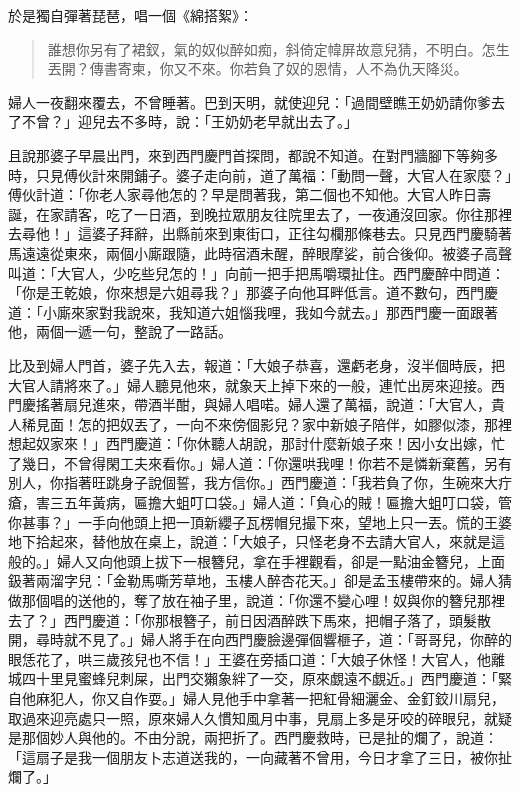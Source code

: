 於是獨自彈著琵琶，唱一個《綿搭絮》：
\begin{quote}
誰想你另有了裙釵，氣的奴似醉如痴，斜倚定幃屏故意兒猜，不明白。怎生丟開？傳書寄柬，你又不來。你若負了奴的恩情，人不為仇天降災。
\end{quote}

婦人一夜翻來覆去，不曾睡著。巴到天明，就使迎兒：「過間壁瞧王奶奶請你爹去了不曾？」迎兒去不多時，說：「王奶奶老早就出去了。」

且說那婆子早晨出門，來到西門慶門首探問，都說不知道。在對門牆腳下等夠多時，只見傅伙計來開鋪子。婆子走向前，道了萬福：「動問一聲，大官人在家麼？」傅伙計道：「你老人家尋他怎的？早是問著我，第二個也不知他。大官人昨日壽誕，在家請客，吃了一日酒，到晚拉眾朋友往院里去了，一夜通沒回家。你往那裡去尋他！」這婆子拜辭，出縣前來到東街口，正往勾欄那條巷去。只見西門慶騎著馬遠遠從東來，兩個小廝跟隨，此時宿酒未醒，醉眼摩娑，前合後仰。被婆子高聲叫道：「大官人，少吃些兒怎的！」向前一把手把馬嚼環扯住。西門慶醉中問道：「你是王乾娘，你來想是六姐尋我？」那婆子向他耳畔低言。道不數句，西門慶道：「小廝來家對我說來，我知道六姐惱我哩，我如今就去。」那西門慶一面跟著他，兩個一遞一句，整說了一路話。

比及到婦人門首，婆子先入去，報道：「大娘子恭喜，還虧老身，沒半個時辰，把大官人請將來了。」婦人聽見他來，就象天上掉下來的一般，連忙出房來迎接。西門慶搖著扇兒進來，帶酒半酣，與婦人唱喏。婦人還了萬福，說道：「大官人，貴人稀見面！怎的把奴丟了，一向不來傍個影兒？家中新娘子陪伴，如膠似漆，那裡想起奴家來！」西門慶道：「你休聽人胡說，那討什麼新娘子來！因小女出嫁，忙了幾日，不曾得閑工夫來看你。」婦人道：「你還哄我哩！你若不是憐新棄舊，另有別人，你指著旺跳身子說個誓，我方信你。」西門慶道：「我若負了你，生碗來大疔瘡，害三五年黃病，匾擔大蛆叮口袋。」婦人道：「負心的賊！匾擔大蛆叮口袋，管你甚事？」一手向他頭上把一頂新纓子瓦楞帽兒撮下來，望地上只一丟。慌的王婆地下拾起來，替他放在桌上，說道：「大娘子，只怪老身不去請大官人，來就是這般的。」婦人又向他頭上拔下一根簪兒，拿在手裡觀看，卻是一點油金簪兒，上面鈒著兩溜字兒：「金勒馬嘶芳草地，玉樓人醉杏花天。」卻是孟玉樓帶來的。婦人猜做那個唱的送他的，奪了放在袖子里，說道：「你還不變心哩！奴與你的簪兒那裡去了？」西門慶道：「你那根簪子，前日因酒醉跌下馬來，把帽子落了，頭髮散開，尋時就不見了。」婦人將手在向西門慶臉邊彈個響榧子，道：「哥哥兒，你醉的眼恁花了，哄三歲孩兒也不信！」王婆在旁插口道：「大娘子休怪！大官人，他離城四十里見蜜蜂兒刺屎，出門交獺象絆了一交，原來覷遠不覷近。」西門慶道：「緊自他麻犯人，你又自作耍。」婦人見他手中拿著一把紅骨細灑金、金釘鉸川扇兒，取過來迎亮處只一照，原來婦人久慣知風月中事，見扇上多是牙咬的碎眼兒，就疑是那個妙人與他的。不由分說，兩把折了。西門慶救時，已是扯的爛了，說道：「這扇子是我一個朋友卜志道送我的，一向藏著不曾用，今日才拿了三日，被你扯爛了。」

